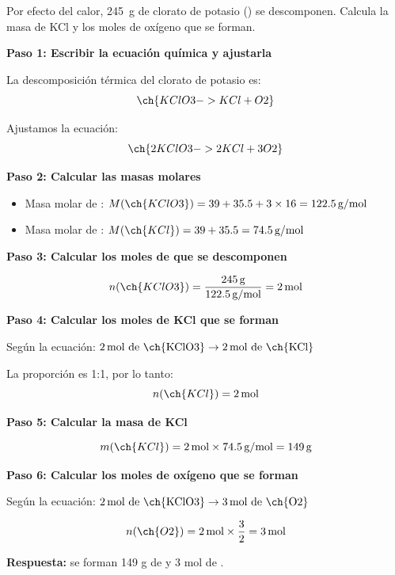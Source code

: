 \begin{exercise}
    Por efecto del calor, \qty{245}{\g} de clorato de potasio () se descomponen. Calcula la masa de KCl y los moles de oxígeno que se forman.
    \begin{solu}
        \textbf{Paso 1: Escribir la ecuación química y ajustarla}

        La descomposición térmica del clorato de potasio es:
        \begin{equation*}
            \ch{KClO3 -> KCl + O2}
        \end{equation*}

        Ajustamos la ecuación:
        \begin{equation*}
            \ch{2 KClO3 -> 2 KCl + 3 O2}
        \end{equation*}

        \textbf{Paso 2: Calcular las masas molares}

        \begin{itemize}
            \item Masa molar de : $M(\ch{KClO3}) = 39 + 35.5 + 3 \times 16 = 122.5\,\text{g/mol}$
            \item Masa molar de : $M(\ch{KCl}) = 39 + 35.5 = 74.5\,\text{g/mol}$
        \end{itemize}

        \textbf{Paso 3: Calcular los moles de  que se descomponen}

        \begin{equation*}
            n(\ch{KClO3}) = \frac{245\,\text{g}}{122.5\,\text{g/mol}} = 2\,\text{mol}
        \end{equation*}

        \textbf{Paso 4: Calcular los moles de KCl que se forman}

        Según la ecuación: $2\,\text{mol de \ch{KClO3}} \rightarrow 2\,\text{mol de \ch{KCl}}$

        La proporción es 1:1, por lo tanto:
        \begin{equation*}
            n(\ch{KCl}) = 2\,\text{mol}
        \end{equation*}

        \textbf{Paso 5: Calcular la masa de KCl}

        \begin{equation*}
            m(\ch{KCl}) = 2\,\text{mol} \times 74.5\,\text{g/mol} = 149\,\text{g}
        \end{equation*}

        \textbf{Paso 6: Calcular los moles de oxígeno que se forman}

        Según la ecuación: $2\,\text{mol de \ch{KClO3}} \rightarrow 3\,\text{mol de \ch{O2}}$

        \begin{equation*}
            n(\ch{O2}) = 2\,\text{mol} \times \frac{3}{2} = 3\,\text{mol}
        \end{equation*}

        \textbf{Respuesta:} se forman 149 g de  y 3 mol de .
    \end{solu}
\end{exercise}

